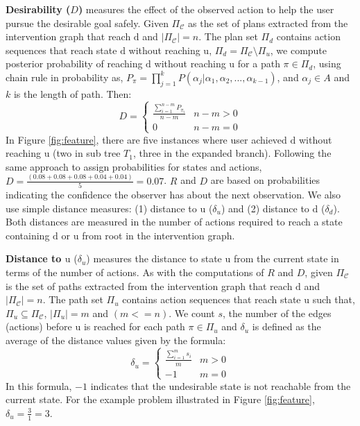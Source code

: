 \documentclass[letterpaper]{article}
\theoremstyle{plain}
\begin{document}
\textbf{Desirability ($D$)} measures the effect of the observed action to help the user pursue the desirable goal safely. Given $\Pi_{\mathcal{C}}$ as the set of plans extracted from the intervention graph that reach $\mathrm{d}$ and $\left | \Pi_{\mathcal{C}} \right |=n$. The plan set $\Pi_{d}$ contains action sequences that reach state $\mathrm{d}$ without reaching $\mathrm{u}$, $\Pi_{d} = \Pi_{\mathcal{C}} \setminus \Pi_{u} $, we compute  posterior probability of reaching $\mathrm{d}$ without reaching $\mathrm{u}$ for a path $\pi \in \Pi_{d}$, using chain rule in probability as, $P_{\pi}=\prod_{j=1}^{k}P(\alpha_j|\alpha_1, \alpha_2,...,\alpha_{k-1})$, and $\alpha_{j} \in A$ and $k$ is the length of path. Then:
\begin{equation*} 
D = \left\{\begin{matrix}
\frac{\sum_{i=1}^{n-m}P_{\pi_i}}{n-m} & n-m>0\\ 
0 &  n-m=0
\end{matrix}\right.
\end{equation*} 
In Figure \ref{fig:feature}, there are five instances where user achieved $\mathrm{d}$  without reaching $\mathrm{u}$ (two in sub tree $T_1$, three in the expanded branch). Following the same approach to assign probabilities for states and actions, $D= \frac{(0.08+0.08+0.08+0.04+0.04)}{5} = 0.07$.
$R$ and $D$ are based on probabilities indicating the confidence the observer has about the next observation. We also use simple distance measures: (1) distance to $\mathrm{u}$  ($\delta_u$) and (2) distance to $\mathrm{d}$ ($\delta_d$). Both distances are measured in the number of actions required to reach a state containing $\mathrm{d}$ or $\mathrm{u}$ from root in the intervention graph.  

\textbf{Distance to $\boldsymbol{\mathrm{u}}$} ($\delta_u$) measures the distance to state $\mathrm{u}$ from the current state in terms of the number of actions. As with the computations of $R$ and $D$, given $\Pi_{\mathcal{C}}$ is the set of paths extracted from the intervention graph that reach $\mathrm{d}$ and $\left | \Pi_{\mathcal{C}} \right |=n$. The path set $\Pi_{u}$ contains action sequences that reach state $\mathrm{u}$ such that, $\Pi_{u} \subseteq \Pi_{\mathcal{C}}$, $\left | \Pi_{u} \right |=m$ and $(m<=n)$. We count  $s$, the number of the edges (actions) before $\mathrm{u}$ is reached for each path $\pi \in \Pi_{u}$ and $\delta_u$ is defined as the average of the distance values given by the formula:
\begin{equation*} 
\delta_u = \left\{\begin{matrix}
\frac{\sum_{i=1}^{m}s_i}{m} & m>0\\ 
-1 &  m=0
\end{matrix}\right.
\end{equation*} 
In this formula, $-1$ indicates that the undesirable state is not reachable from the current state. For the example problem illustrated in Figure \ref{fig:feature}, $\delta_u=\frac{3}{1}=3$. 
\end{document}
